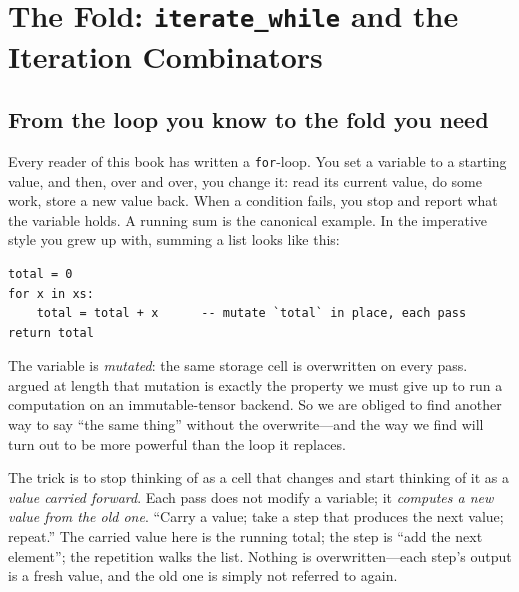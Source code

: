 \chapter{The Fold: \texttt{iterate\_while} and the Iteration Combinators}
\label{ch:fold}


\section{From the loop you know to the fold you need}

Every reader of this book has written a \texttt{for}-loop. You set a variable to
a starting value, and then, over and over, you change it: read its current value,
do some work, store a new value back. When a condition fails, you stop and report
what the variable holds. A running sum is the canonical example. In the
imperative style you grew up with, summing a list looks like this:
\begin{lstlisting}[style=l4style]
total = 0
for x in xs:
    total = total + x      -- mutate `total` in place, each pass
return total
\end{lstlisting}
The variable  is \emph{mutated}: the same storage cell is overwritten
on every pass.  argued at length that mutation is exactly the
property we must give up to run a computation on an immutable-tensor backend. So
we are obliged to find another way to say ``the same thing'' without the
overwrite---and the way we find will turn out to be more powerful than the loop
it replaces.

The trick is to stop thinking of  as a cell that changes and start
thinking of it as a \emph{value carried forward}. Each pass does not modify a
variable; it \emph{computes a new value from the old one}. ``Carry a value;
take a step that produces the next value; repeat.'' The carried value here is the
running total; the step is ``add the next element''; the repetition walks the
list. Nothing is overwritten---each step's output is a fresh value, and the old
one is simply not referred to again.

